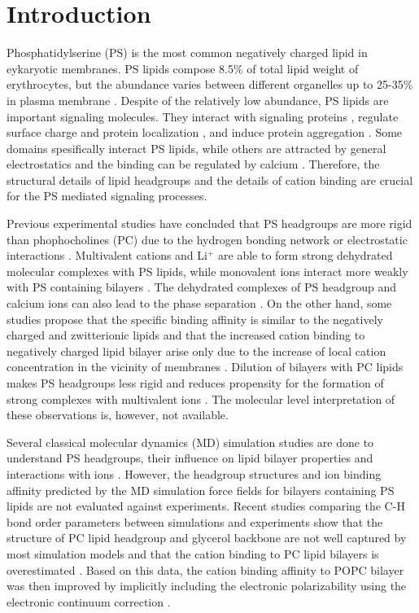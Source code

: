 \documentclass[aps,prl,superscriptaddress,twocolumn]{revtex4}
\begin{document}
\section{Introduction}
Phosphatidylserine (PS) is the most common negatively
charged lipid in eykaryotic membranes.
PS lipids compose 8.5\% of total lipid weight of erythrocytes,
but the abundance varies between different organelles up to
25-35\% in plasma membrane \cite{lemmon08,leventis10,li14}.
Despite of the relatively low abundance, PS lipids
are important signaling molecules. They interact with
signaling proteins \cite{leventis10}, regulate
surface charge and protein localization \cite{yeung08}, and
induce protein aggregation \cite{zhao04,gorbenko06}.
Some domains spesifically interact PS lipids,
while others are attracted by general electrostatics and the
binding can be regulated by calcium \cite{leventis10}.
Therefore, the structural details
of lipid headgroups and the details of cation binding
are crucial for the PS mediated signaling processes.

Previous experimental studies have concluded that
PS headgroups are more rigid than phophocholines (PC)
due to the hydrogen bonding network or
electrostatic interactions \cite{browning80,buldt81}.
Multivalent cations and Li$^+$ are able to form strong
dehydrated molecular complexes with PS lipids,
while monovalent ions interact more weakly with PS
containing bilayers \cite{hauser77,kurland79,eisenberg79,hauser83,dluhy83,hauser85,feigenson86,mattai89,roux90,roux91,boettcher11}.
The dehydrated complexes of PS headgroup and calcium ions can also lead to the
phase separation \cite{hauser77,kurland79,hauser85,feigenson86,mattai89,roux90,roux91}.
On the other hand, some studies propose that the specific binding
affinity is similar to the negatively charged and zwitterionic lipids and that
the increased cation binding to negatively charged lipid bilayer arise only due
to the increase of local cation concentration in the vicinity of membranes \cite{seelig90,sinn06}.
Dilution of bilayers with PC lipids makes PS headgroups
less rigid and reduces propensity for the formation of
strong complexes with multivalent ions \cite{browning80,buldt81,roux90,roux91}.
The molecular level interpretation of these observations is,
however, not available.

Several classical molecular dynamics (MD) simulation studies are done
to understand PS headgroups, their influence on lipid bilayer properties and
interactions with
ions \cite{cascales96,pandit02,mukhopadhyay04,pedersen06,vernier09,boettcher11,molina12,jurkiewicz12,venable13,pan14,vangaveti14,melcrova16,valentine18}.
However, the headgroup structures and ion binding affinity 
predicted by the MD simulation force fields for bilayers containing PS lipids are not
evaluated against experiments. Recent studies comparing the
C-H bond order parameters between simulations and experiments show that the
structure of PC lipid headgroup and glycerol backbone are not well
captured by most simulation models \cite{botan15} and that the cation binding to PC
lipid bilayers is overestimated \cite{catte16}. Based on this data,
the cation binding affinity to POPC bilayer was then improved by implicitly
including the electronic polarizability using the electronic continuum correction \cite{melcr18}.
\end{document}
